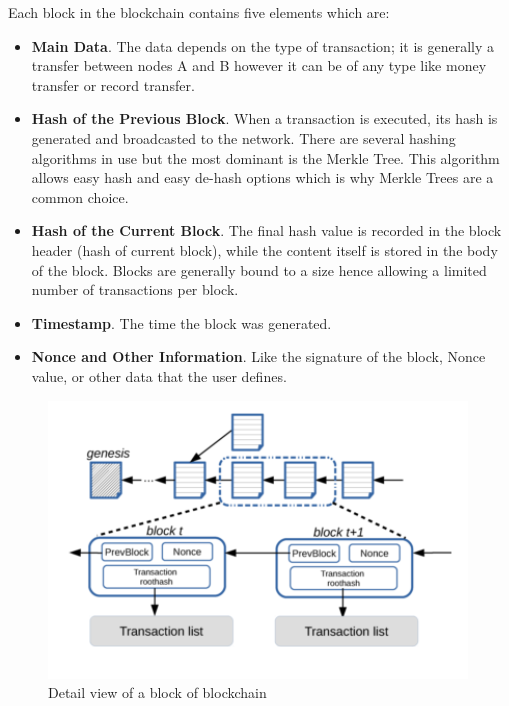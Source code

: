 Each block in the blockchain contains five elements which are: 
\begin{itemize}
\item \textbf{Main Data}. The data depends on the type of transaction; it is generally a transfer between nodes A and B however it can be of any type like money transfer or record transfer.
\item \textbf{Hash of the Previous Block}. When a transaction is executed, its hash is generated and broadcasted to the network. There are several hashing algorithms in use but the most dominant is the Merkle Tree. This algorithm allows easy hash and easy de-hash options which is why Merkle Trees are a common choice.
\item \textbf{Hash of the Current Block}. The final hash value is recorded in the block header (hash of current block), while the content itself is stored in the body of the block. Blocks are generally bound to a size hence allowing a limited number of transactions per block.
\item \textbf{Timestamp}. The time the block was generated.
\item \textbf{Nonce and Other Information}. Like the signature of the block, Nonce value, or other data that the user defines.
\end{itemize}
\begin{figure}[H]
    \centering
    \includegraphics[width=\textwidth]{imgs/blockchain_block_structure.png}
    \caption{Detail view of a block of blockchain}
    \label{fig:Detail view of a block of blockchain}
    \end{figure}

\vspace{1cm}


